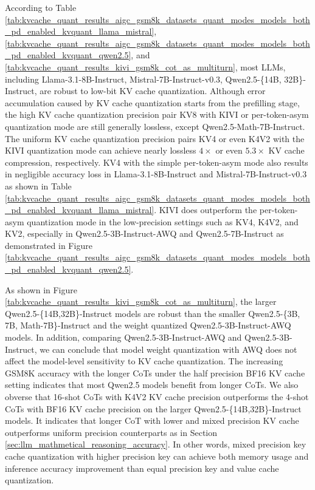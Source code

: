 According to Table \ref{tab:kvcache_quant_results_aigc_gsm8k_datasets_quant_modes_models_both_pd_enabled_kvquant_llama_mistral}, \ref{tab:kvcache_quant_results_aigc_gsm8k_datasets_quant_modes_models_both_pd_enabled_kvquant_qwen2.5},  and \ref{tab:kvcache_quant_results_kivi_gsm8k_cot_as_multiturn}, most LLMs, including Llama-3.1-8B-Instruct, Mistral-7B-Instruct-v0.3, Qwen2.5-\{14B, 32B\}-Instruct, are robust to low-bit KV cache quantization. Although error accumulation caused by KV cache quantization starts from the prefilling stage, the high KV cache quantization precision pair KV8 with KIVI or per-token-asym quantization mode are still generally lossless, except Qwen2.5-Math-7B-Instruct. The uniform KV cache quantization precision pairs KV4 or even K4V2 with the KIVI quantization mode can achieve nearly lossless $4\times$ or even $5.3\times$ KV cache compression, respectively. KV4 with the simple per-token-asym mode also results in negligible accuracy loss in Llama-3.1-8B-Instruct and Mistral-7B-Instruct-v0.3 as shown in Table \ref{tab:kvcache_quant_results_aigc_gsm8k_datasets_quant_modes_models_both_pd_enabled_kvquant_llama_mistral}. KIVI does outperform the per-token-asym quantization mode in the low-precision settings such as KV4, K4V2, and KV2, especially in Qwen2.5-3B-Instruct-AWQ and Qwen2.5-7B-Instruct as demonstrated in Figure \ref{tab:kvcache_quant_results_aigc_gsm8k_datasets_quant_modes_models_both_pd_enabled_kvquant_qwen2.5}. 

As shown in Figure \ref{tab:kvcache_quant_results_kivi_gsm8k_cot_as_multiturn}, the larger Qwen2.5-\{14B,32B\}-Instruct models are robust than the smaller Qwen2.5-\{3B, 7B, Math-7B\}-Instruct and the weight quantized Qwen2.5-3B-Instruct-AWQ models. In addition, comparing Qwen2.5-3B-Instruct-AWQ and Qwen2.5-3B-Instruct, we can conclude that model weight quantization with AWQ does not affect the model-level sensitivity to KV cache quantization. The increasing GSM8K accuracy with the longer CoTs under the half precision BF16 KV cache setting indicates that most Qwen2.5 models benefit from longer CoTs. We also obverse that 16-shot CoTs with K4V2 KV cache precision outperforms the 4-shot CoTs with BF16 KV cache precision on the larger Qwen2.5-\{14B,32B\}-Instruct models. It indicates that longer CoT with lower and mixed precision KV cache outperforms uniform precision counterparts as in Section \ref{sec:llm_mathmetical_reasoning_accuracy}. In other words, mixed precision key cache quantization with higher precision key can achieve both memory usage and inference accuracy improvement than equal precision key and value cache quantization.

